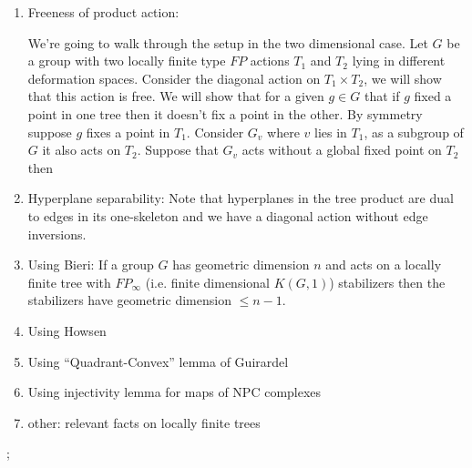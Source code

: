 \documentclass{article}
\theoremstyle{mystyle}
\theoremstyle{remark}
\begin{document}
\begin{enumerate}
    \item Freeness of product action:

	    We're going to walk through the setup in the two dimensional case. Let \(G\) be a group with two locally finite type \(FP\) actions \(T_{1}\) and \(T_{2}\) lying in different deformation spaces.  Consider the diagonal action on \(T_{1} \times T_{2}\), we will show that this action is free. {\color{mypink1}We will show that for a given \(g \in G\) that if \(g\) fixed a point in one tree then it doesn't fix a point in the other. By symmetry suppose \(g\) fixes a point in \(T_{1}\). Consider \(G_{v}\) where \(v\) lies in \(T_{1}\), as a subgroup of \(G\) it also acts on \(T_{2}\). Suppose that \(G_{v}\) acts without a global fixed point on \(T_{2}\) then }
    \item Hyperplane separability:
        Note that hyperplanes in the tree product are dual to edges in its one-skeleton and we have a diagonal action without edge inversions.
    \item Using Bieri: If a group \(G\) has geometric dimension \(n\) and acts on a locally finite tree with \(FP_\infty\) (i.e. finite dimensional \(K(G,1)\)) stabilizers then the stabilizers have geometric dimension \(\leq n-1\).
    \item Using Howsen
    \item Using ``Quadrant-Convex'' lemma of Guirardel 
    \item Using injectivity lemma for maps of NPC complexes
    \item other: relevant facts on locally finite trees
\end{enumerate};
\end{document}
